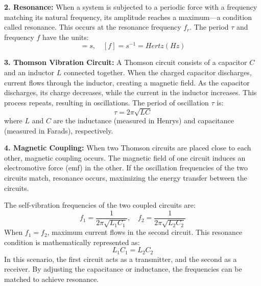 \documentclass[journal]{IEEEtran}
\begin{document}
\textbf{2. Resonance:}
When a system is subjected to a periodic force with a frequency matching its natural frequency, its amplitude reaches a maximum—a condition called resonance. This occurs at the resonance frequency \(f_r\). The period \(\tau\) and frequency \(f\) have the units:
\begin{equation}
    [\tau] = s, \quad [f] = s^{-1} = Hertz (Hz)
\end{equation}

\textbf{3. Thomson Vibration Circuit:}
A Thomson circuit consists of a capacitor \(C\) and an inductor \(L\) connected together. When the charged capacitor discharges, current flows through the inductor, creating a magnetic field. As the capacitor discharges, its charge decreases, while the current in the inductor increases. This process repeats, resulting in oscillations. The period of oscillation \(\tau\) is:
\begin{equation}
    \tau = 2\pi \sqrt{LC}
\end{equation}
where \(L\) and \(C\) are the inductance (measured in Henrys) and capacitance (measured in Farads), respectively.

\textbf{4. Magnetic Coupling:}
When two Thomson circuits are placed close to each other, magnetic coupling occurs. The magnetic field of one circuit induces an electromotive force (emf) in the other. If the oscillation frequencies of the two circuits match, resonance occurs, maximizing the energy transfer between the circuits.

The self-vibration frequencies of the two coupled circuits are:
\begin{equation}
    f_1 = \frac{1}{2\pi \sqrt{L_1 C_1}}, \quad f_2 = \frac{1}{2\pi \sqrt{L_2 C_2}}
\end{equation}
When \(f_1 = f_2\), maximum current flows in the second circuit. This resonance condition is mathematically represented as:
\begin{equation}
    L_1 C_1 = L_2 C_2
\end{equation}
In this scenario, the first circuit acts as a transmitter, and the second as a receiver. By adjusting the capacitance or inductance, the frequencies can be matched to achieve resonance.

\end{document}
